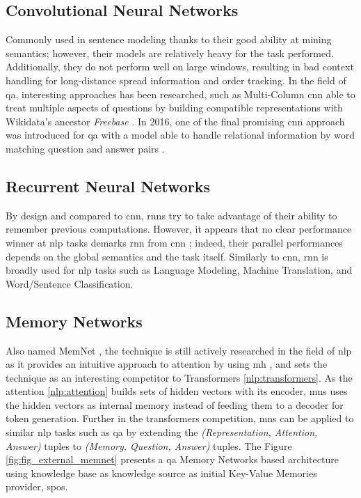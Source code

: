 \subsection{Convolutional Neural Networks}
Commonly used in sentence modeling thanks to their good ability at mining semantics; however, their models are relatively heavy for the task performed. Additionally, they do not perform well on large windows, resulting in bad context handling for long-distance spread information and order tracking. In the field of \gls{qa}, interesting approaches has been researched, such as Multi-Column \gls{cnn} \autocite{paper:Dong2015} able to treat multiple aspects of questions by building compatible representations with Wikidata's ancestor \textit{Freebase} \autocite{paper:bollacker2008}. In 2016, one of the final promising \gls{cnn} approach was introduced for \gls{qa} with a model able to handle relational information by word matching question and answer pairs \autocite{paper:Severyn2016}.

\subsection{Recurrent Neural Networks}
 By design and compared to \gls{cnn}, \glspl{rnn} try to take advantage of their ability to remember previous computations. However, it appears that no clear performance winner at \gls{nlp} tasks demarks \gls{rnn} from \gls{cnn} \autocite{paper:Yin2017}; indeed, their parallel performances depends on the global semantics and the task itself. Similarly to \gls{cnn}, \gls{rnn} is broadly used for \gls{nlp} tasks such as Language Modeling, Machine Translation, and Word/Sentence Classification.

\subsection{Memory Networks}
Also named MemNet \autocite{paper:Weston2015MemoryN}, the technique is still actively researched in the field of \gls{nlp} as it provides an intuitive approach to attention by using \gls{mh} \autocite{paper:journals/corr/TangQL16}, and sets the technique as an interesting competitor to Transformers \ref{nlp:transformers}. As the \gls{attention} \ref{nlp:attention} builds sets of hidden vectors with its encoder, \glspl{mn} uses the hidden vectors as internal memory instead of feeding them to a decoder for token generation. Further in the \glspl{transformer} competition, \glspl{mn} can be applied to similar \gls{nlp} tasks such as \gls{qa} \autocite{paper:journals/corr/KumarISBEPOGS15} by extending the \textit{(Representation, Attention, Answer)} tuples to \textit{(Memory, Question, Answer)} tuples. The Figure \ref{fig:fig_external_memnet} presents a \gls{qa} Memory Networks based architecture using knowledge base as knowledge source as initial Key-Value Memories provider, \glspl{spo}.

